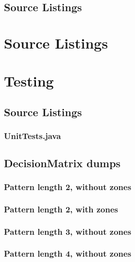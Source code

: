 \newpage
\appendix
\section{Source Listings}
%

\chapter{Source Listings}


\chapter{Testing}

\section{Source Listings}
\subsection{UnitTests.java}


\section{DecisionMatrix dumps}

\subsection{Pattern length 2, without zones}


\subsection{Pattern length 2, with zones}


\subsection{Pattern length 3, without zones}


\subsection{Pattern length 4, without zones}




